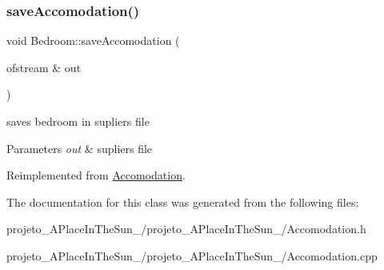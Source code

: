 \subsubsection{\texorpdfstring{save\+Accomodation()}{saveAccomodation()}}
{\footnotesize\ttfamily void Bedroom\+::save\+Accomodation (\begin{DoxyParamCaption}\item[{ofstream \&}]{out }\end{DoxyParamCaption})\hspace{0.3cm}{\ttfamily [virtual]}}



saves bedroom in supliers file 


\begin{DoxyParams}{Parameters}
{\em out} & supliers file \\
\hline
\end{DoxyParams}


Reimplemented from \hyperlink{class_accomodation_a4394eb907b2d5a23faf73dd03c1dac4d}{Accomodation}.



The documentation for this class was generated from the following files\+:\begin{DoxyCompactItemize}
\item 
projeto\+\_\+\+A\+Place\+In\+The\+Sun\+\_/projeto\+\_\+\+A\+Place\+In\+The\+Sun\+\_/Accomodation.\+h\item 
projeto\+\_\+\+A\+Place\+In\+The\+Sun\+\_/projeto\+\_\+\+A\+Place\+In\+The\+Sun\+\_/Accomodation.\+cpp\end{DoxyCompactItemize}
